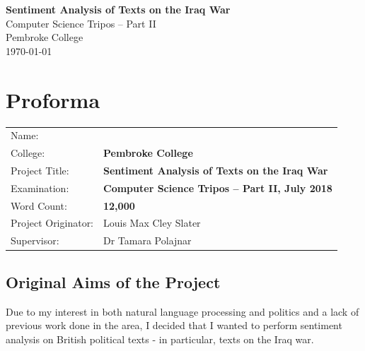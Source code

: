 \documentclass[12pt,a4paper,twoside,openright]{report}
\begin{document}





\pagestyle{empty}


\vspace*{60mm}
\begin{center}
\Huge
\textbf{Sentiment Analysis of Texts on the Iraq War} \\[5mm]
Computer Science Tripos -- Part II \\[5mm]
Pembroke College \\[5mm]
\today  %
\end{center}


\pagestyle{plain}

\chapter*{Proforma}

{\large
\begin{tabular}{ll}
Name:               & \bf                        \\
College:            & \bf Pembroke College                     \\
Project Title:      & \bf Sentiment Analysis of Texts on the Iraq War \\
Examination:        & \bf Computer Science Tripos -- Part II, July 2018  \\
Word Count:         & \bf 12,000  \\
Project Originator: & Louis Max Cley Slater                    \\
Supervisor:         & Dr Tamara Polajnar                    \\ 
\end{tabular}
}


\section*{Original Aims of the Project}

Due to my interest in both natural language processing and politics and a lack of previous work done in the area, I decided that I wanted to perform sentiment analysis on British political texts - in particular, texts on the Iraq war.
\end{document}

